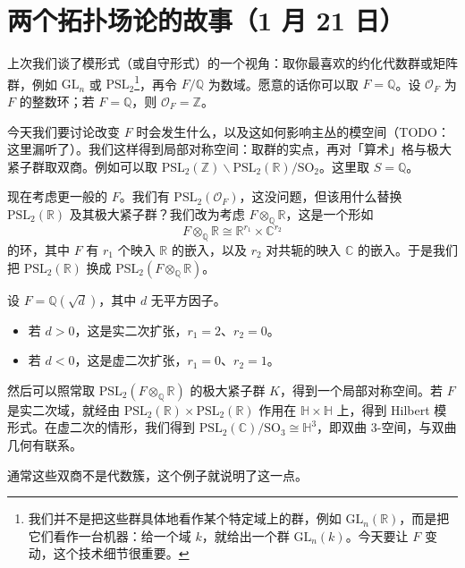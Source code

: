 \section[两个拓扑场论的故事]{两个拓扑场论的故事（1 月 21 日）}

上次我们谈了模形式（或自守形式）的一个视角：取你最喜欢的约化代数群或矩阵群，例如 $\mathrm{GL}_n$ 或 $\mathrm{PSL}_2$\footnote{我们并不是把这些群具体地看作某个特定域上的群，例如 $\mathrm{GL}_n(\mathbb{R})$，而是把它们看作一台机器：给一个域 $k$，就给出一个群 $\mathrm{GL}_n(k)$。今天要让 $F$ 变动，这个技术细节很重要。}，再令 $F/\mathbb{Q}$ 为数域。愿意的话你可以取 $F=\mathbb{Q}$。设 $\mathcal{O}_F$ 为 $F$ 的整数环；若 $F=\mathbb{Q}$，则 $\mathcal{O}_F=\mathbb{Z}$。

今天我们要讨论改变 $F$ 时会发生什么，以及这如何影响主丛的模空间（TODO：这里漏听了）。我们这样得到局部对称空间：取群的实点，再对「算术」格与极大紧子群取双商。例如可以取 $\mathrm{PSL}_2(\mathbb{Z})\backslash\mathrm{PSL}_2(\mathbb{R})/\mathrm{SO}_2$。这里取 $S=\mathbb{Q}$。

现在考虑更一般的 $F$。我们有 $\mathrm{PSL}_2(\mathcal{O}_F)$，这没问题，但该用什么替换 $\mathrm{PSL}_2(\mathbb{R})$ 及其极大紧子群？我们改为考虑 $F\otimes_{\mathbb{Q}}\mathbb{R}$，这是一个形如
\[
F\otimes_{\mathbb{Q}}\mathbb{R}\cong\mathbb{R}^{r_1}\times\mathbb{C}^{r_2}
\]
的环，其中 $F$ 有 $r_1$ 个映入 $\mathbb{R}$ 的嵌入，以及 $r_2$ 对共轭的映入 $\mathbb{C}$ 的嵌入。于是我们把 $\mathrm{PSL}_2(\mathbb{R})$ 换成 $\mathrm{PSL}_2(F\otimes_{\mathbb{Q}}\mathbb{R})$。

\begin{example}
设 $F=\mathbb{Q}(\sqrt{d})$，其中 $d$ 无平方因子。
\begin{itemize}
  \item 若 $d>0$，这是实二次扩张，$r_1=2$、$r_2=0$。
  \item 若 $d<0$，这是虚二次扩张，$r_1=0$、$r_2=1$。
\end{itemize}
\end{example}

然后可以照常取 $\mathrm{PSL}_2(F\otimes_{\mathbb{Q}}\mathbb{R})$ 的极大紧子群 $K$，得到一个局部对称空间。若 $F$ 是实二次域，就经由 $\mathrm{PSL}_2(\mathbb{R})\times\mathrm{PSL}_2(\mathbb{R})$ 作用在 $\mathbb{H}\times\mathbb{H}$ 上，得到 Hilbert 模形式。在虚二次的情形，我们得到 $\mathrm{PSL}_2(\mathbb{C})/\mathrm{SO}_3\cong\mathbb{H}^3$，即双曲 3-空间，与双曲几何有联系。


通常这些双商不是代数簇，这个例子就说明了这一点。


